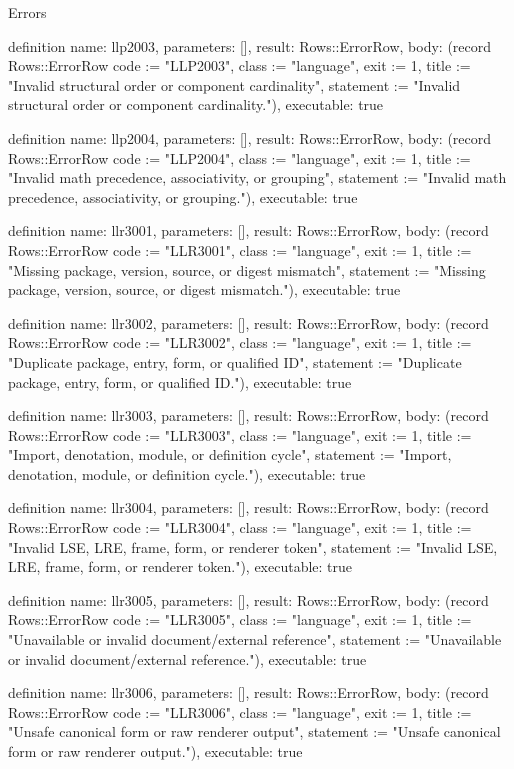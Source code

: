 \begin{lexlean}{Errors}
\begin{semanticmodule}
definition{
  name: llp2003,
  parameters: [],
  result: Rows::ErrorRow,
  body: (record Rows::ErrorRow {code := "LLP2003", class := "language", exit := 1, title := "Invalid structural order or component cardinality", statement := "Invalid structural order or component cardinality."}),
  executable: true
}

definition{
  name: llp2004,
  parameters: [],
  result: Rows::ErrorRow,
  body: (record Rows::ErrorRow {code := "LLP2004", class := "language", exit := 1, title := "Invalid math precedence, associativity, or grouping", statement := "Invalid math precedence, associativity, or grouping."}),
  executable: true
}

definition{
  name: llr3001,
  parameters: [],
  result: Rows::ErrorRow,
  body: (record Rows::ErrorRow {code := "LLR3001", class := "language", exit := 1, title := "Missing package, version, source, or digest mismatch", statement := "Missing package, version, source, or digest mismatch."}),
  executable: true
}

definition{
  name: llr3002,
  parameters: [],
  result: Rows::ErrorRow,
  body: (record Rows::ErrorRow {code := "LLR3002", class := "language", exit := 1, title := "Duplicate package, entry, form, or qualified ID", statement := "Duplicate package, entry, form, or qualified ID."}),
  executable: true
}

definition{
  name: llr3003,
  parameters: [],
  result: Rows::ErrorRow,
  body: (record Rows::ErrorRow {code := "LLR3003", class := "language", exit := 1, title := "Import, denotation, module, or definition cycle", statement := "Import, denotation, module, or definition cycle."}),
  executable: true
}

definition{
  name: llr3004,
  parameters: [],
  result: Rows::ErrorRow,
  body: (record Rows::ErrorRow {code := "LLR3004", class := "language", exit := 1, title := "Invalid LSE, LRE, frame, form, or renderer token", statement := "Invalid LSE, LRE, frame, form, or renderer token."}),
  executable: true
}

definition{
  name: llr3005,
  parameters: [],
  result: Rows::ErrorRow,
  body: (record Rows::ErrorRow {code := "LLR3005", class := "language", exit := 1, title := "Unavailable or invalid document/external reference", statement := "Unavailable or invalid document/external reference."}),
  executable: true
}

definition{
  name: llr3006,
  parameters: [],
  result: Rows::ErrorRow,
  body: (record Rows::ErrorRow {code := "LLR3006", class := "language", exit := 1, title := "Unsafe canonical form or raw renderer output", statement := "Unsafe canonical form or raw renderer output."}),
  executable: true
}


\end{semanticmodule}
\end{lexlean}
